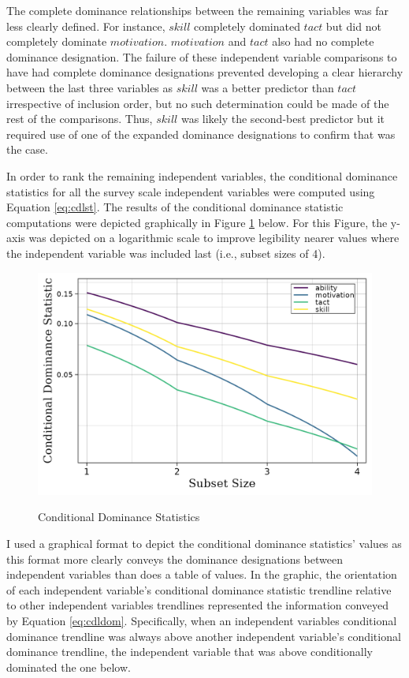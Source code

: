 \documentclass[man]{apa7}
\begin{document}
	The complete dominance relationships between the remaining variables was far less clearly defined. 
	For instance, $skill$ completely dominated $tact$ but did not completely dominate $motivation$.
	$motivation$ and $tact$ also had no complete dominance designation.
	The failure of these independent variable comparisons to have had complete dominance designations prevented developing a clear hierarchy between the last three variables as $skill$ was a better predictor than $tact$ irrespective of inclusion order, but no such determination could be made of the rest of the comparisons.
	Thus, $skill$ was likely the second-best predictor but it required use of one of the expanded dominance designations to confirm that was the case.
	
	In order to rank the remaining independent variables, the conditional dominance statistics for all the survey scale independent variables were computed using Equation \ref{eq:cdlst}.
	The results of the conditional dominance statistic computations were depicted graphically in Figure \ref{fg:cdl} below.
	For this Figure, the y-axis was depicted on a logarithmic scale to improve legibility nearer values where the independent variable was included last (i.e., subset sizes of 4).
	
	\begin{figure}[h!]
		\centering
		\caption{\centering Conditional Dominance Statistics}
		\includegraphics{condit_gph}
		\label{fg:cdl}
	\end{figure}

	I used a graphical format to depict the conditional dominance statistics' values as this format more clearly conveys the dominance designations between independent variables than does a table of values. 
	In the graphic, the orientation of each independent variable's conditional dominance statistic trendline relative to other independent variables trendlines represented the information conveyed by Equation \ref{eq:cdldom}.
	Specifically, when an independent variables conditional dominance trendline was always above another independent variable's conditional dominance trendline, the independent variable that was above conditionally dominated the one below.
	
\end{document}
